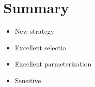 \section{Summary}

%
%

\begin{itemize}
  \item New strategy
  \item Excellent selectio
  \item Excellent parmeterization
  \item Sensitive
\end{itemize}



